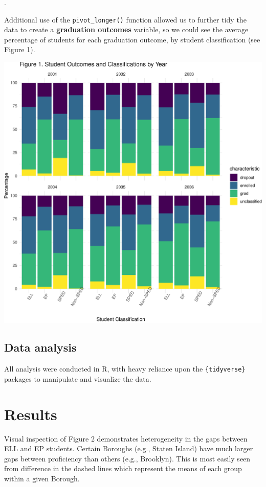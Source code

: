 \documentclass[
  english,
  man, fleqn, noextraspace]{apa6}
\begin{document}
.

Additional use of the \texttt{pivot\_longer()} function allowed us to further tidy the data to create a \textbf{graduation outcomes} variable, so we could see the average percentage of students for each graduation outcome, by student classification (see Figure 1).

\includegraphics{EDLD_651_Final_Project_Draft_files/figure-latex/descriptives_of_dataset-1.pdf}

\hypertarget{data-analysis}{%
\subsection{Data analysis}\label{data-analysis}}

All analysis were conducted in R, with heavy reliance upon the \texttt{\{tidyverse\}} packages to manipulate and visualize the data.

\hypertarget{results}{%
\section{Results}\label{results}}

Visual inspection of Figure 2 demonstrates heterogeneity in the gaps between ELL and EP students. Certain Boroughs (e.g., Staten Island) have much larger gaps between proficiency than others (e.g., Brooklyn). This is most easily seen from difference in the dashed lines which represent the means of each group within a given Borough.
\end{document}
